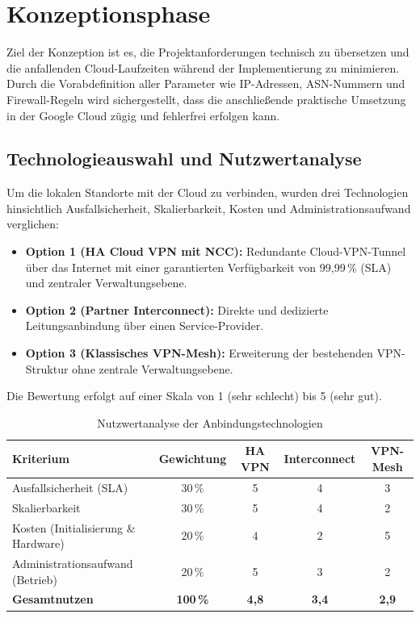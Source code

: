 \chapter{Konzeptionsphase}

Ziel der Konzeption ist es, die Projektanforderungen technisch zu übersetzen und die anfallenden Cloud-Laufzeiten während der Implementierung zu minimieren. Durch die Vorabdefinition aller Parameter wie IP-Adressen, ASN-Nummern und Firewall-Regeln wird sichergestellt, dass die anschließende praktische Umsetzung in der Google Cloud zügig und fehlerfrei erfolgen kann.

\section{Technologieauswahl und Nutzwertanalyse}
Um die lokalen Standorte mit der Cloud zu verbinden, wurden drei Technologien hinsichtlich Ausfallsicherheit, Skalierbarkeit, Kosten und Administrationsaufwand verglichen:

\begin{itemize}
    \item \textbf{Option 1 (HA Cloud VPN mit NCC):} Redundante Cloud-VPN-Tunnel über das Internet mit einer garantierten Verfügbarkeit von 99,99\,\% (SLA) und zentraler Verwaltungsebene.
    \item \textbf{Option 2 (Partner Interconnect):} Direkte und dedizierte Leitungsanbindung über einen Service-Provider.
    \item \textbf{Option 3 (Klassisches VPN-Mesh):} Erweiterung der bestehenden VPN-Struktur ohne zentrale Verwaltungsebene.
\end{itemize}

Die Bewertung erfolgt auf einer Skala von 1 (sehr schlecht) bis 5 (sehr gut).

\begin{table}[!ht]
\centering
\begin{tabularx}{\textwidth}{|X|c|c|c|c|}
\hline
\textbf{Kriterium} & \textbf{Gewichtung} & \textbf{HA VPN} & \textbf{Interconnect} & \textbf{VPN-Mesh} \\ \hline
Ausfallsicherheit (SLA) & 30\,\% & 5 & 4 & 3 \\ \hline
Skalierbarkeit & 30\,\% & 5 & 4 & 2 \\ \hline
Kosten (Initialisierung \& Hardware) & 20\,\% & 4 & 2 & 5 \\ \hline
Administrationsaufwand (Betrieb) & 20\,\% & 5 & 3 & 2 \\ \hline
\textbf{Gesamtnutzen} & \textbf{100\,\%} & \cellcolor{ggreen!30}\textbf{4,8} & \cellcolor{gyellow!40}\textbf{3,4} & \cellcolor{gred!30}\textbf{2,9} \\ \hline
\end{tabularx}
\caption{Nutzwertanalyse der Anbindungstechnologien}
\end{table}

